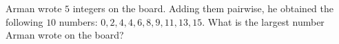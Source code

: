 Arman wrote $5$ integers on the board. Adding them pairwise, he obtained the following $10$ numbers: $0, 2, 4, 4, 6, 8, 9, 11, 13, 15$. What is the largest number Arman wrote on the board?
